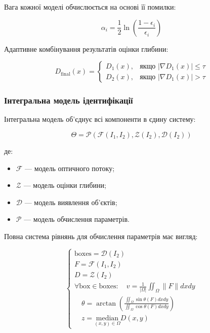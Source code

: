 \documentclass[14pt, a4paper]{extarticle}
\numberwithin{equation}{section}
\begin{document}
Вага кожної моделі обчислюється на основі її помилки:

\begin{equation}
\alpha_i = \frac{1}{2} \ln\left( \frac{1 - \epsilon_i}{\epsilon_i} \right) \tag{3.34}
\end{equation}

Адаптивне комбінування результатів оцінки глибини:

\begin{equation}
\boxed{D_{\text{final}}(x) = \begin{cases} 
D_1(x), & \text{якщо } |\nabla D_1(x)| \leq \tau \\ 
D_2(x), & \text{якщо } |\nabla D_1(x)| > \tau 
\end{cases}} \tag{3.35}
\end{equation}

\subsubsection{Інтегральна модель ідентифікації}

Інтегральна модель об'єднує всі компоненти в єдину систему:

\begin{equation}
\boxed{\Theta = \mathcal{P}\left(\mathcal{F}(I_1,I_2), \mathcal{Z}(I_2), \mathcal{D}(I_2)\right)} \tag{3.36}
\end{equation}

де:
\begin{itemize}
\item $\mathcal{F}$ — модель оптичного потоку;
\item $\mathcal{Z}$ — модель оцінки глибини;
\item $\mathcal{D}$ — модель виявлення об'єктів;
\item $\mathcal{P}$ — модель обчислення параметрів.
\end{itemize}

Повна система рівнянь для обчислення параметрів має вигляд:

\begin{equation}
\begin{cases}
\text{boxes} = \mathcal{D}(I_2) \\
F = \mathcal{F}(I_1, I_2) \\
D = \mathcal{Z}(I_2) \\
\forall \text{box} \in \text{boxes}: \quad v = \frac{1}{|\Omega|} \iint_{\Omega} \|F\| dxdy \\
\quad \theta = \arctan\left(\frac{\iint_{\Omega} \sin\theta(F) dxdy}{\iint_{\Omega} \cos\theta(F) dxdy}\right) \\
\quad z = \underset{(x,y)\in\Omega}{\text{median}} D(x,y)
\end{cases} \tag{3.37}
\end{equation}
\end{document}
